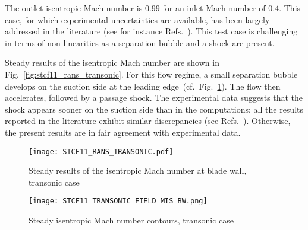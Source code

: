 
The outlet isentropic Mach number is $0.99$ for an inlet Mach number of $0.4$. 
This case, for which experimental uncertainties are available, 
has been largely addressed in the literature 
(see for instance Refs.~\cite{Sbardella:2001fk,Duta:2002uq,Campobasso:2003fk,Cinnella2004}). 
This test case is challenging in terms of non-linearities as a separation bubble and a shock are present.

Steady results of the isentropic Mach number are shown in
Fig.~\ref{fig:stcf11_rans_transonic}.  For this flow regime,
a small separation
bubble develops on the suction side at the leading edge~(cf.~Fig.~\ref{fig:stcf11_transonic_field_mis_bw}).  The flow then accelerates, followed by a passage shock.  
The experimental data suggests that the shock appears
sooner on the suction side than in the computations; all the results 
reported in the literature exhibit similar discrepancies (see
Refs.~\cite{Fransson:1999uq,Sbardella:2001fk,Duta:2002uq,Campobasso:2003fk,Cinnella2004}). 
Otherwise, the present results are in fair agreement with experimental data.
\begin{figure}[htb]
  \centering
  \begin{minipage}[b]{.46\linewidth}
    \centering
    \texttt{[image: STCF11\_RANS\_TRANSONIC.pdf]}
    \caption{Steady results of the isentropic Mach number at blade
      wall, transonic case}
    \label{fig:stcf11_rans_transonic}
  \end{minipage}\quad
  \begin{minipage}[b]{.46\linewidth}
    \centering
    \texttt{[image: STCF11\_TRANSONIC\_FIELD\_MIS\_BW.png]}
    \caption{Steady isentropic Mach number contours, transonic case}
    \label{fig:stcf11_transonic_field_mis_bw}
  \end{minipage}
\end{figure}

